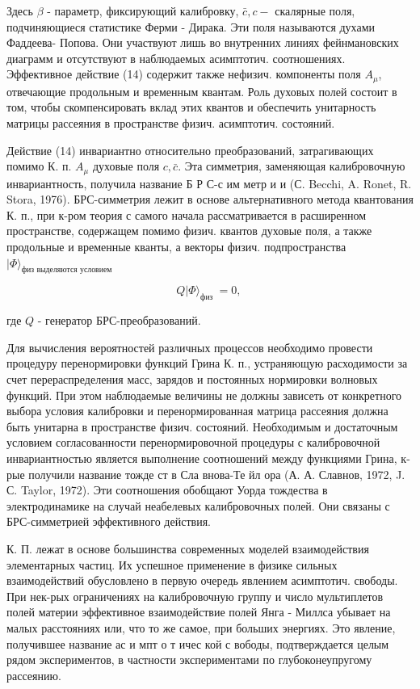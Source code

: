 \documentclass[10pt]{article}
\begin{document}
Здесь $\beta$ - параметр, фиксирующий калибровку, $\bar{c}, c-$ скалярные поля, подчиняющиеся статистике Ферми - Дирака. Эти поля называются духами Фаддеева- Попова. Они участвуют лишь во внутренних линиях фейнмановских диаграмм и отсутствуют в наблюдаемых асимптотич. соотношениях. Эффективное действие (14) содержит также нефизич. компоненты поля $A_{\mu}$, отвечающие продольным и временным квантам. Роль духовых полей состоит в том, чтобы скомпенсировать вклад этих квантов и обеспечить унитарность матрицы рассеяния в пространстве физич. асимптотич. состояний.



Действие (14) инвариантно относительно преобразований, затрагивающих помимо К. п. $A_{\mu}$ духовые поля $c, \bar{c}$. Эта симметрия, заменяющая калибровочную инвариантность, получила название Б Р С-с им метр и и (С. Becchi, A. Ronet, R. Stora, 1976). БРС-симметрия лежит в основе альтернативного метода квантования К. п., при к-ром теория с самого начала рассматривается в расширенном пространстве, содержащем помимо физич. квантов духовые поля, а также продольные и временные кванты, а векторы физич. подпространства $|\Phi\rangle_{\text {физ выделяются условием }}$



\[

Q|\Phi\rangle_{\text {физ }}=0 \text {, }

\]



где $Q$ - генератор БРС-преобразований.



Для вычисления вероятностей различных процессов необходимо провести процедуру перенормировки функций Грина К. п., устраняющую расходимости за счет перераспределения масс, зарядов и постоянных нормировки волновых функций. При этом наблюдаемые величины не должны зависеть от конкретного выбора условия калибровки и перенормированная матрица рассеяния должна быть унитарна в пространстве физич. состояний. Необходимым и достаточным условием согласованности перенормировочной процедуры с калибровочной инвариантностью является выполнение соотношений между функциями Грина, к-рые получили название тожде ст в Сла внова-Те йл ора (А. А. Славнов, 1972, J. С. Taylor, 1972). Эти соотношения обобщают Уорда тождества в электродинамике на случай неабелевых калибровочных полей. Они связаны с БРС-симметрией эффективного действия.



К. П. лежат в основе большинства современных моделей взаимодействия элементарных частиц. Их успешное применение в физике сильных взаимодействий обусловлено в первую очередь явлением асимптотич. свободы. При нек-рых ограничениях на калибровочную группу и число мультиплетов полей материи эффективное взаимодействие полей Янга - Миллса убывает на малых расстояниях или, что то же самое, при больших энергиях. Это явление, получившее название ас и мпт о т ичес кой с вободы, подтверждается целым рядом экспериментов, в частности экспериментами по глубоконеупругому рассеянию.
\end{document}
